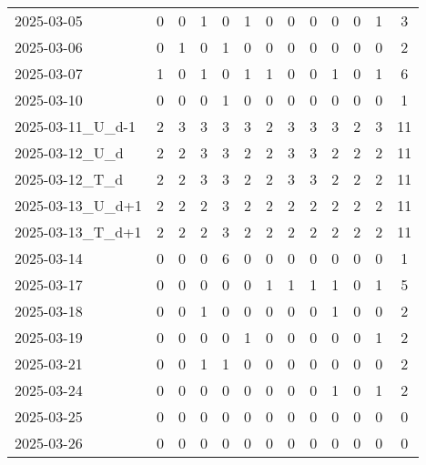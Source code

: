 \documentclass[dvipdfmx,oneside]{article}
\begin{document}
\begin{longtable}{lcccccccccccc}
        2025-03-05 &     0 &     0 &     1 &     0 &     1 &     0 &     0 &     0 &     0 &     0 &     1 &      3 \\
        2025-03-06 &     0 &     1 &     0 &     1 &     0 &     0 &     0 &     0 &     0 &     0 &     0 &      2 \\
        2025-03-07 &     1 &     0 &     1 &     0 &     1 &     1 &     0 &     0 &     1 &     0 &     1 &      6 \\
        2025-03-10 &     0 &     0 &     0 &     1 &     0 &     0 &     0 &     0 &     0 &     0 &     0 &      1 \\
2025-03-11\_U\_d-1 &     2 &     3 &     3 &     3 &     3 &     2 &     3 &     3 &     3 &     2 &     3 &     11 \\
  2025-03-12\_U\_d &     2 &     2 &     3 &     3 &     2 &     2 &     3 &     3 &     2 &     2 &     2 &     11 \\
  2025-03-12\_T\_d &     2 &     2 &     3 &     3 &     2 &     2 &     3 &     3 &     2 &     2 &     2 &     11 \\
2025-03-13\_U\_d+1 &     2 &     2 &     2 &     3 &     2 &     2 &     2 &     2 &     2 &     2 &     2 &     11 \\
2025-03-13\_T\_d+1 &     2 &     2 &     2 &     3 &     2 &     2 &     2 &     2 &     2 &     2 &     2 &     11 \\
        2025-03-14 &     0 &     0 &     0 &     6 &     0 &     0 &     0 &     0 &     0 &     0 &     0 &      1 \\
        2025-03-17 &     0 &     0 &     0 &     0 &     0 &     1 &     1 &     1 &     1 &     0 &     1 &      5 \\
        2025-03-18 &     0 &     0 &     1 &     0 &     0 &     0 &     0 &     0 &     1 &     0 &     0 &      2 \\
        2025-03-19 &     0 &     0 &     0 &     0 &     1 &     0 &     0 &     0 &     0 &     0 &     1 &      2 \\
        2025-03-21 &     0 &     0 &     1 &     1 &     0 &     0 &     0 &     0 &     0 &     0 &     0 &      2 \\
        2025-03-24 &     0 &     0 &     0 &     0 &     0 &     0 &     0 &     0 &     1 &     0 &     1 &      2 \\
        2025-03-25 &     0 &     0 &     0 &     0 &     0 &     0 &     0 &     0 &     0 &     0 &     0 &      0 \\
        2025-03-26 &     0 &     0 &     0 &     0 &     0 &     0 &     0 &     0 &     0 &     0 &     0 &      0 \\

\end{longtable}
\end{document}
